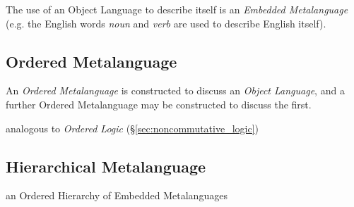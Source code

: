The use of an Object Language to describe itself is an \emph{Embedded
  Metalanguage} (e.g. the English words \emph{noun} and \emph{verb}
are used to describe English itself).



\subsection{Ordered Metalanguage}\label{sec:ordered_metalanguage}

An \emph{Ordered Metalanguage} is constructed to discuss an
\emph{Object Language}, and a further Ordered Metalanguage may be
constructed to discuss the first.

analogous to \emph{Ordered Logic}
(\S\ref{sec:noncommutative_logic})



\subsection{Hierarchical Metalanguage}\label{sec:hierarchical_metalanguage}

an Ordered Hierarchy of Embedded Metalanguages
